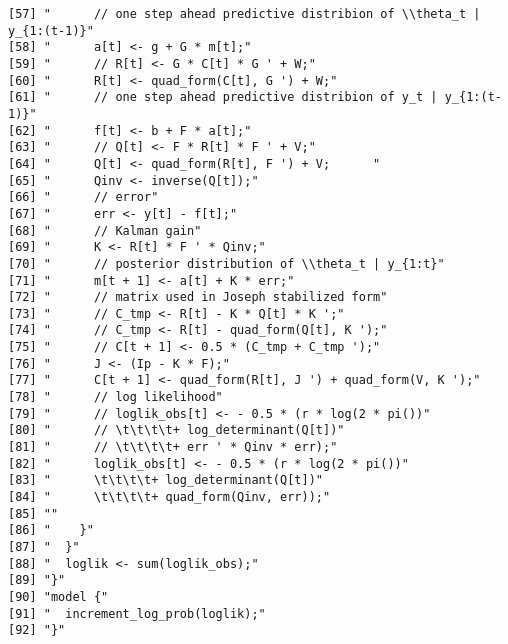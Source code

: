 \documentclass{article}\usepackage[]{graphicx}\usepackage[]{color}
\makeatletter
\newenvironment{kframe}{%
 \def\at@end@of@kframe{}%
 \ifinner\ifhmode%
  \def\at@end@of@kframe{\end{minipage}}%
  \begin{minipage}{\columnwidth}%
 \fi\fi%
 \def\FrameCommand##1{\hskip\@totalleftmargin \hskip-\fboxsep
 \colorbox{shadecolor}{##1}\hskip-\fboxsep
     \hskip-\linewidth \hskip-\@totalleftmargin \hskip\columnwidth}%
 \MakeFramed {\advance\hsize-\width
   \@totalleftmargin\z@ \linewidth\hsize
   \@setminipage}}%
 {\par\unskip\endMakeFramed%
 \at@end@of@kframe}
\newenvironment{knitrout}{}{} %
\makeatother
\begin{document}
\begin{knitrout}
\begin{kframe}
\begin{verbatim}
[57] "      // one step ahead predictive distribion of \\theta_t | y_{1:(t-1)}"
[58] "      a[t] <- g + G * m[t];"                                             
[59] "      // R[t] <- G * C[t] * G ' + W;"                                    
[60] "      R[t] <- quad_form(C[t], G ') + W;"                                 
[61] "      // one step ahead predictive distribion of y_t | y_{1:(t-1)}"      
[62] "      f[t] <- b + F * a[t];"                                             
[63] "      // Q[t] <- F * R[t] * F ' + V;"                                    
[64] "      Q[t] <- quad_form(R[t], F ') + V;      "                           
[65] "      Qinv <- inverse(Q[t]);"                                            
[66] "      // error"                                                          
[67] "      err <- y[t] - f[t];"                                               
[68] "      // Kalman gain"                                                    
[69] "      K <- R[t] * F ' * Qinv;"                                           
[70] "      // posterior distribution of \\theta_t | y_{1:t}"                  
[71] "      m[t + 1] <- a[t] + K * err;"                                       
[72] "      // matrix used in Joseph stabilized form"                          
[73] "      // C_tmp <- R[t] - K * Q[t] * K ';"                                
[74] "      // C_tmp <- R[t] - quad_form(Q[t], K ');"                          
[75] "      // C[t + 1] <- 0.5 * (C_tmp + C_tmp ');"                           
[76] "      J <- (Ip - K * F);"                                                
[77] "      C[t + 1] <- quad_form(R[t], J ') + quad_form(V, K ');"             
[78] "      // log likelihood"                                                 
[79] "      // loglik_obs[t] <- - 0.5 * (r * log(2 * pi())"                    
[80] "      // \t\t\t\t+ log_determinant(Q[t])"                                
[81] "      // \t\t\t\t+ err ' * Qinv * err);"                                 
[82] "      loglik_obs[t] <- - 0.5 * (r * log(2 * pi())"                       
[83] "      \t\t\t\t+ log_determinant(Q[t])"                                   
[84] "      \t\t\t\t+ quad_form(Qinv, err));"                                  
[85] ""                                                                        
[86] "    }"                                                                   
[87] "  }"                                                                     
[88] "  loglik <- sum(loglik_obs);"                                            
[89] "}"                                                                       
[90] "model {"                                                                 
[91] "  increment_log_prob(loglik);"                                           
[92] "}"                                                                       
\end{verbatim}
\end{kframe}
\end{knitrout}
\end{document}
